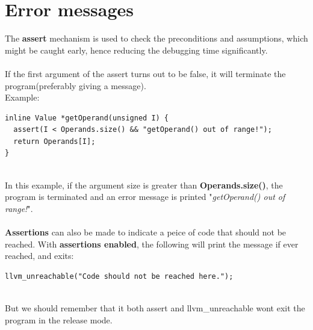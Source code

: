 \documentclass{article}
\begin{document}
\section{Error messages}
The \textbf{assert} mechanism is used to check the preconditions and assumptions, which might be caught early, hence reducing the debugging time significantly.\\
\\
If the first argument of the assert turns out to be false, it will terminate the program(preferably giving a message).\\
Example:
\begin{verbatim}
inline Value *getOperand(unsigned I) {
  assert(I < Operands.size() && "getOperand() out of range!");
  return Operands[I];
}
\end{verbatim}
\\
In this example, if the argument size is greater than \textbf{Operands.size()}, the program is terminated and an error message is printed "\textit{getOperand() out of range!}".\\
\\
\textbf{Assertions} can also be made to indicate a peice of code that should not be reached. With \textbf{assertions enabled}, the following will print the message if ever reached, and exits:
\begin{verbatim}
llvm_unreachable("Code should not be reached here.");
\end{verbatim}
\\
But we should remember that it both assert and llvm\_unreachable wont exit the program in the release mode.
\end{document}
